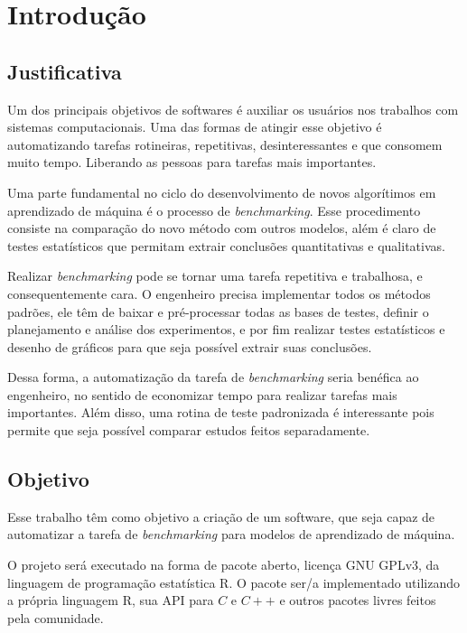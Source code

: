 
\chapter{Introdução}
\label{chap:introducao}

\section{Justificativa}
\label{sec:justificativa}
Um dos principais objetivos de softwares é auxiliar os usuários nos trabalhos com sistemas computacionais. Uma das formas de atingir esse objetivo é automatizando tarefas rotineiras, repetitivas, desinteressantes e que consomem muito tempo. Liberando as pessoas para tarefas mais importantes. 

Uma parte fundamental no ciclo do desenvolvimento de novos algorítimos em aprendizado de máquina é o processo de \textit{benchmarking}. Esse procedimento consiste na comparação do novo método com outros modelos, além é claro de testes estatísticos que permitam extrair conclusões quantitativas e qualitativas.

Realizar \textit{benchmarking} pode se tornar uma tarefa repetitiva e trabalhosa, e consequentemente cara. O engenheiro precisa implementar todos os métodos padrões, ele têm de baixar e pré-processar todas as bases de testes, definir o planejamento e análise dos experimentos, e por fim realizar testes estatísticos e desenho de gráficos para que seja possível extrair suas conclusões.

Dessa forma, a automatização da tarefa de \textit{benchmarking} seria benéfica ao engenheiro, no sentido de economizar tempo para realizar tarefas mais importantes. Além disso, uma rotina de teste padronizada é interessante pois permite que seja possível comparar estudos feitos separadamente.


\section{Objetivo}
\label{sec:objetivo}
Esse trabalho têm como objetivo a criação de um software, que seja capaz de automatizar a tarefa de \textit{benchmarking} para modelos de aprendizado de máquina. 

O projeto será executado na forma de pacote aberto, licença GNU GPLv3, da linguagem de programação estatística R. O pacote ser/a implementado utilizando a própria linguagem R, sua API para $C$ e $C++$ e outros pacotes livres feitos pela comunidade.

